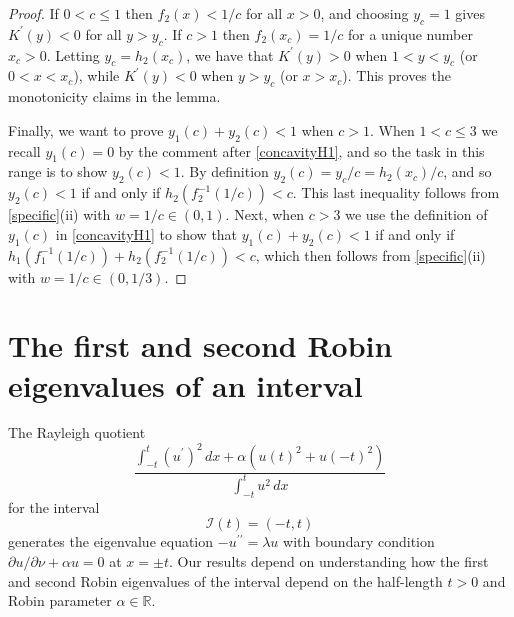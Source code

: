 \documentclass[12pt,reqno]{amsart}
\theoremstyle{definition}
\newcommand{\R}{{\mathbb R}}
\begin{document}
\begin{proof}
If $0 < c \leq 1$ then $f_2(x)<1/c$ for all $x>0$, and choosing $y_c=1$ gives $K^\prime(y)<0$ for all $y>y_c$. If $c>1$ then $f_2(x_c) = 1/c$ for a unique number $x_c>0$. Letting $y_c=h_2(x_c)$, we have that $K^\prime(y)>0$ when $1<y<y_c$ (or $0<x<x_c$), while $K^\prime(y)<0$ when $y>y_c$ (or $x>x_c$). This proves the monotonicity claims in the lemma. 

Finally, we want to prove $y_1(c)+y_2(c)<1$ when $c>1$. When $1 < c \leq 3$ we recall $y_1(c)=0$ by the comment after \autoref{concavityH1}, and so the task in this range is to show $y_2(c)<1$. By definition $y_2(c)=y_c/c=h_2(x_c)/c$, and so $y_2(c)<1$ if and only if $h_2(f_2^{-1}(1/c))<c$. This last inequality follows from \autoref{specific}(ii) with $w=1/c \in (0,1)$. Next, when $c > 3$ we use the definition of $y_1(c)$ in \autoref{concavityH1} to show that $y_1(c)+y_2(c)<1$ if and only if $h_1(f_1^{-1}(1/c))+h_2(f_2^{-1}(1/c))<c$, which then follows from \autoref{specific}(ii) with $w=1/c \in (0,1/3)$. 
\end{proof}


\section{\bf The first and second Robin eigenvalues of an interval}
\label{identifyinginterval}

The Rayleigh quotient 
\[
\frac{\int_{-t}^t (u^\prime)^2 \, dx + \alpha \left( u(t)^2 + u(-t)^2 \right) }{\int_{-t}^t u^2 \, dx} 
\]
for the interval 
\[
\mathcal{I}(t)=(-t,t)
\]
generates the eigenvalue equation $-u^{\prime \prime} = \lambda u$ with boundary condition $\partial u / \partial \nu + \alpha u = 0$ at $x=\pm t$. Our results depend on understanding how the first and second Robin eigenvalues of the interval depend on the half-length $t>0$ and Robin parameter $\alpha \in \R$. 
\end{document}
